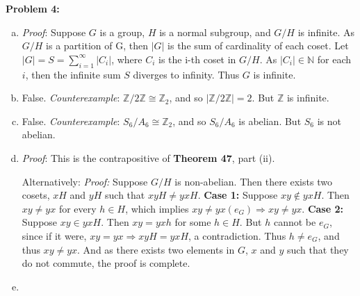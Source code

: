 \documentclass[12pt, letterpaper]{article}
\newenvironment{problem}
    [1]
    {\noindent \textbf{Problem #1:}}
    {\vspace{3mm}}
\begin{document}
\begin{problem}{4}
    \begin{enumerate}[(a)]
        \item \emph{Proof}: Suppose $G$ is a group, $H$ is a normal subgroup, and $G/H$ is infinite.
        As $G/H$ is a partition of G, then $|G|$ is the sum of cardinality of each coset. Let $|G| = 
        S = \sum_{i=1}^{\infty} |C_i|$, where $C_i$ is the i-th coset in $G/H$. As $|C_i| \in 
        \mathbb{N}$ for each $i$, then the infinite sum $S$ diverges to infinity. Thus $G$ is infinite.
        
        \item False. \emph{Counterexample}: $\mathbb{Z} / 2\mathbb{Z} \cong \mathbb{Z}_2$, and so
        $|\mathbb{Z} / 2\mathbb{Z}| = 2$. But $\mathbb{Z}$ is infinite.
        
        \item False. \emph{Counterexample}: $S_6/A_6 \cong \mathbb{Z}_2$, and so $S_6/A_6$ is abelian.
        But $S_6$ is not abelian.
        
        \item \emph{Proof}: This is the contrapositive of \textbf{Theorem 47}, part (ii).

        \bigskip\noindent
        Alternatively: \emph{Proof:} Suppose $G/H$ is non-abelian. Then there exists two cosets, $xH$ and $yH$ 
        such that $xyH \neq yxH$. \textbf{Case 1:} Suppose $xy \notin yxH$. Then $xy \neq yx$ for every $h \in H$,
        which implies $xy \neq yx(e_G) \Rightarrow xy \neq yx$. \textbf{Case 2:} Suppose $xy \in yxH$. Then
        $xy = yxh$ for some $h \in H$. But $h$ cannot be $e_G$, since if it were, $xy = yx \Rightarrow
        xyH = yxH$, a contradiction. Thus $h \neq e_G$, and thus $xy \neq yx$. And as there exists two elements in
        $G$, $x$ and $y$ such that they do not commute, the proof is complete.
        
        \item
    \end{enumerate}
\end{problem}
\end{document}
